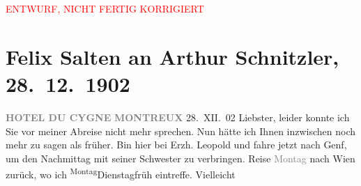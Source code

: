 
\begin{center}
            \textcolor{red}{ENTWURF, NICHT FERTIG KORRIGIERT}
                      \end{center}
            
         
         \renewcommand{\erwaehntePersonen}{Personen: Samuel Fischer, Hugo von Hofmannsthal,  Luise von Österreich-Toskana, Leopold Ferdinand Salvator Wölfling}
         \renewcommand{\erwaehnteOrte}{Orte: Genf, Hotel du Cygne Montreux, Montreux, Wien}
         \renewcommand{\erwaehnteWerke}{}
               \section[Felix Salten an Arthur Schnitzler, 28. 12. 1902]{ Felix Salten an Arthur Schnitzler, 28. 12. 1902}\nopagebreak{}\rehead{ }\begin{ledgroupsized}[t]{13cm}\normalsize\beginnumbering \toendnotes[C]{\smallbreak\pagebreak[2]} 
\toendnotes[C]{\smallbreak}\pstart
           \noindent{}\raggedleft{}{\pb}\textcolor{gray}{\textbf{HOTEL DU CYGNE}}\pend
           \pstart
           \noindent{}\raggedleft{}\textcolor{gray}{\textbf{MONTREUX}}\pend
           \pstart
           \raggedleft{}28. XII. 02\pend
           \pstart
           Liebster, leider konnte ich Sie vor meiner Abreise nicht mehr
               sprechen. Nun hätte ich Ihnen inzwischen noch mehr zu sagen als früher. \pend
           \pstart
           Bin hier bei Erzh. Leopold und fahre jetzt
               nach Genf, um den Nachmittag mit seiner Schwester zu verbringen.
               Reise \textcolor{gray}{Montag} nach Wien zurück,
               wo ich \substVorne{}\textsuperscript{Montag}{\allowbreak}\substDazwischen{}Dienstag\substHinten{}{ }{\pb}früh eintreffe. Vielleicht

\end{ledgroupsized}
